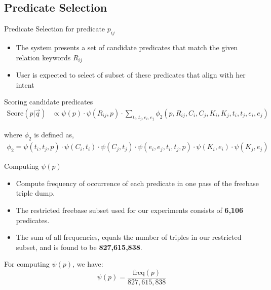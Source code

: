 \documentclass[pdf,11pt]{beamer}
\begin{document}
\subsection{Predicate Selection}

\begin{frame}{Predicate Selection for predicate $p_{ij}$}

\begin{itemize}
\item<1-> The system presents a set of candidate predicates that match the given relation keywords $R_{ij}$
\item<2-> User is expected to select of subset of these predicates that align with her intent
\end{itemize}

\vspace{11pt}


\vspace{11pt}


\end{frame}


\begin{frame}{Scoring candidate predicates}
\begin{align}
\text{Score}(p|\vec{q})& \propto \psi(p) \cdot \psi(R_{ij},p) \cdot \sum_{t_i,t_j,e_i,e_j} \phi_2(p, R_{ij}, C_i, C_j, K_i, K_j, t_i, t_j, e_i, e_j) \nonumber
\end{align}

where $\phi_2$ is defined as,
\begin{align}
\phi_2 =  \psi(t_i,t_j,p) \cdot \psi(C_i,t_i) \cdot \psi(C_j,t_j) \cdot \psi(e_i,e_j,t_i,t_j,p) \cdot \psi(K_i,e_i) \cdot \psi(K_j,e_j) \label{eq:phi2}
\nonumber
\end{align}

\end{frame}

\begin{frame}{Computing $\psi(p)$}
\begin{itemize}
\item Compute frequency of occurrence of each predicate in one pass of the freebase triple dump.
\item The restricted freebase subset used for our experiments consists of \textbf{6,106} predicates.
\item The sum of all frequencies, equals the number of triples in our restricted subset, and is found to be \textbf{827,615,838}.
\end{itemize}
For computing $\psi(p)$, we have:
$$\psi(p) = \frac{\text{freq}(p)}{827,615,838}$$
\end{frame}
\end{document}
